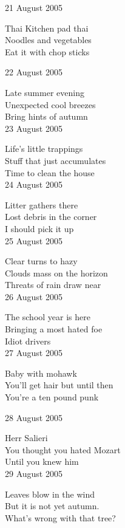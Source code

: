 \documentclass[12pt]{article}
\begin{document}
21 August 2005

Thai Kitchen pad thai \\
Noodles and vegetables \\
Eat it with chop sticks \\


\newpage

22 August 2005

Late summer evening \\
Unexpected cool breezes \\
Bring hints of autumn \\

23 August 2005

Life's little trappings \\
Stuff that just accumulates \\
Time to clean the house \\

24 August 2005

Litter gathers there \\
Lost debris in the corner \\
I should pick it up \\

25 August 2005

Clear turns to hazy \\
Clouds mass on the horizon \\
Threats of rain draw near \\

26 August 2005

The school year is here \\
Bringing a most hated foe \\
Idiot drivers \\

27 August 2005

Baby with mohawk \\
You'll get hair but until then \\
You're a ten pound punk \\



\newpage

28 August 2005

Herr Salieri \\
You thought you hated Mozart \\
Until you knew him \\

29 August 2005

Leaves blow in the wind \\
But it is not yet autumn. \\
What's wrong with that tree? \\
\end{document}
